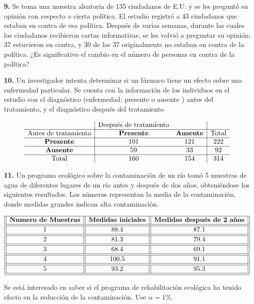 \documentclass[
  a4paper,
  oneside,
  openany]{book}
\begin{document}
\textbf{9.} Se toma una muestra aleatoria de 135 ciudadanos de E.U. y se les preguntó su opinión con respecto a cierta política. El estudio registró a 43 ciudadanos que estaban en contra de esa política. Después de varias semanas, durante las cuales los ciudadanos recibieron cartas informativas, se les volvió a preguntar su opinión; 37 estuvieron en contra, y 30 de las 37 originalmente no estaban en contra de la política. ¿Es significativo el cambio en el número de personas en contra de la política?

\textbf{10.} Un investigador intenta determinar si un fármaco tiene un efecto sobre una enfermedad particular. Se cuenta con la información de los individuos en el estudio con el diagnóstico (enfermedad: presente o ausente ) antes del tratamiento, y el diagnóstico después del tratamiento

\[
\begin{array}{c| c c|c} 
&\mbox{Después de tratamiento}&&\\
\hline
\mbox{Antes de tratamiento}& \textbf{Presente} & \textbf{Ausente} & \mbox{Total} \\  
\hline
\textbf{Presente} & 101& 121&222\\
\hline
\textbf{Ausente} & 59& 33&92\\
\hline
\mbox{Total}&160&154&314\\
\end{array}
\]

\textbf{11.} Un programa ecológico sobre la contaminación de un río tomó 5 muestras de agua de diferentes lugares de un río antes y después de dos años, obteniéndose los siguientes resultados. Los números representan la media de la contaminación, donde medidas grandes indican alta contaminación.

\[
\begin{array}{||c| |c| |c||} 
\hline 
\textbf{Numero de Muestras} & \textbf{Medidas iniciales} & \textbf{Medidas después de 2 años}  \\  
\hline
\hline
1 &88.4& 87.1 \\
\hline
\hline
2& 81.3 &79.4 \\
\hline
\hline
3 &68.4 & 69.1 \\
\hline
\hline
4 &100.5& 91.1 \\
\hline
\hline
5 & 93.2&95.3 \\
\hline
\hline
\end{array}
\]

Se está interesado en saber si el programa de rehabilitación ecológica ha tenido efecto en la reducción de la contaminación. Use \(\alpha =1\%\).
\end{document}
